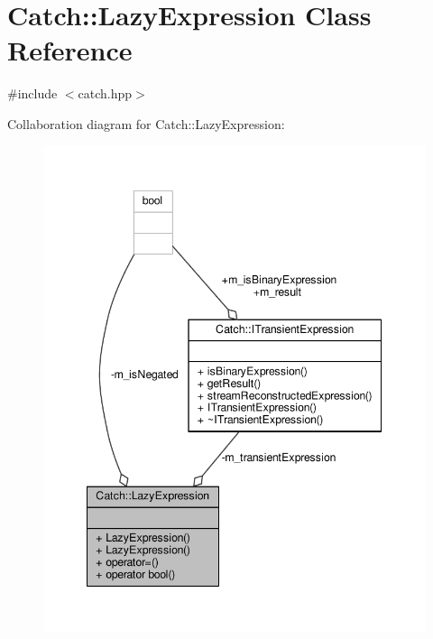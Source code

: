 \hypertarget{class_catch_1_1_lazy_expression}{\section{Catch\-:\-:Lazy\-Expression Class Reference}
\label{class_catch_1_1_lazy_expression}
}


{\ttfamily \#include $<$catch.\-hpp$>$}



Collaboration diagram for Catch\-:\-:Lazy\-Expression\-:
\nopagebreak
\begin{figure}[H]
\begin{center}
\leavevmode
\includegraphics[width=345pt]{class_catch_1_1_lazy_expression__coll__graph}
\end{center}
\end{figure}
